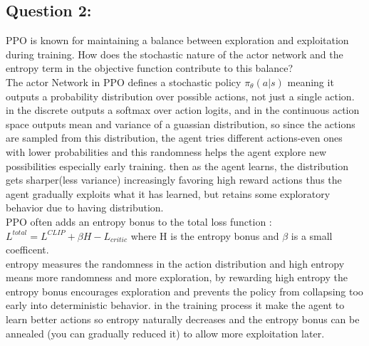 \documentclass[12pt]{article}
\begin{document}
{{{\subsection{Question 2:} PPO is known for maintaining a balance between exploration and exploitation during training. How does the stochastic nature of the actor network and the entropy term in the objective function contribute to this balance?\\
The actor Network in PPO defines a stochastic policy $\pi_{\theta}(a|s)$ meaning it outputs a probability distribution over possible actions, not just a single action. in the discrete outputs a softmax over action logits, and in the continuous action space outputs mean and variance of a guassian distribution, so since the actions are sampled from this distribution, the agent tries different actions-even ones with lower probabilities and this randomness helps the agent explore new possibilities especially early training. then as the agent learns, the distribution gets sharper(less variance) increasingly favoring high reward actions thus the agent gradually exploits what it has learned, but retains some exploratory behavior due to having distribution.\\
PPO often adds an entropy bonus to the total loss function : 
$L^{total} = L^{CLIP} + \beta H - L_{critic} $ where H is the entropy bonus and $\beta$ is a small coefficent.\\
entropy measures the randomness in the action distribution and high entropy means more randomness and more exploration, by rewarding high entropy the entropy bonus encourages exploration and prevents the policy from collapsing too early into deterministic behavior. in the training process it make the agent to learn better actions so entropy naturally decreases and the entropy bonus can be annealed (you can gradually reduced it) to allow more exploitation later.\\
}}}
\end{document}
